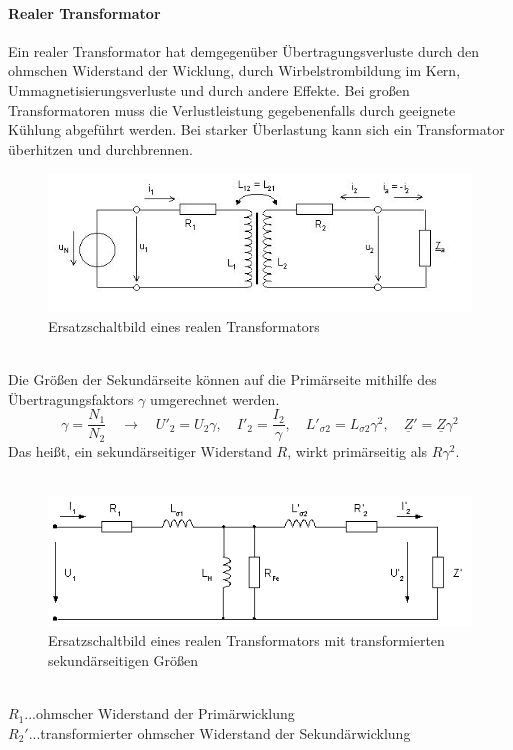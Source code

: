 				\paragraph*{Realer Transformator}
					Ein realer Transformator hat demgegenüber Übertragungsverluste durch den ohmschen Widerstand der Wicklung, durch Wirbelstrombildung im Kern, Ummagnetisierungsverluste und durch andere Effekte. Bei großen Transformatoren muss die Verlustleistung gegebenenfalls durch geeignete Kühlung abgeführt werden. Bei starker Überlastung kann sich ein Transformator überhitzen und durchbrennen.
					\begin{figure}[h]
						\centering
						\includegraphics[width=0.7\linewidth]{./pics/el/trafo3}
						\caption{Ersatzschaltbild eines realen Transformators}
					\end{figure}\\
					Die Größen der Sekundärseite können auf die Primärseite mithilfe des Übertragungsfaktors $ \gamma $ umgerechnet werden.
					\[\gamma = \frac{N_{1}}{N_{2}} \quad \rightarrow \quad U'_{2}=U_{2}\gamma, \quad I'_{2}=\dfrac{I_{2}}{\gamma}, \quad L'_{\sigma2}=L_{\sigma2}\gamma^{2}, \quad \underline{Z}'=\underline{Z}\gamma^{2} \]
					Das heißt, ein sekundärseitiger Widerstand $ R $, wirkt primärseitig als $ R\gamma^{2} $.\\\\
					\begin{figure}[h]
						\centering
						\includegraphics[width=0.7\linewidth]{./pics/el/trafo1.png}
						\caption{Ersatzschaltbild eines realen Transformators mit transformierten sekundärseitigen Größen}
					\end{figure}\\
					\tab[1cm] $R_{1}$\tab...\tab ohmscher Widerstand der Primärwicklung \\
					\tab[1cm] $R_{2}'$\tab...\tab transformierter ohmscher Widerstand der Sekundärwicklung \\
